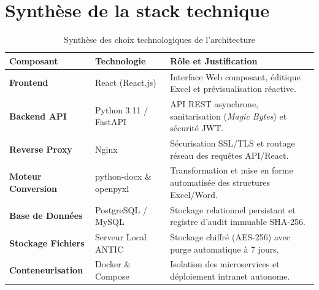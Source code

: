 \section{Synthèse de la stack technique}

\begin{table}[H]
\centering
\small
\begin{tabular}{|L{3cm}|L{3.5cm}|L{7.5cm}|}
\hline
{}
\textbf{Composant} & \textbf{Technologie} & \textbf{Rôle et Justification} \\
\hline
\textbf{Frontend} & React (React.js) & Interface Web composant, éditique Excel et prévisualisation réactive. \\
\hline
\textbf{Backend API} & Python 3.11 / FastAPI & API REST asynchrone, sanitarisation (\textit{Magic Bytes}) et sécurité JWT. \\
\hline
\textbf{Reverse Proxy} & Nginx & Sécurisation SSL/TLS et routage réseau des requêtes API/React. \\
\hline
\textbf{Moteur Conversion} & python-docx \& openpyxl & Transformation et mise en forme automatisée des structures Excel/Word. \\
\hline
\textbf{Base de Données} & PostgreSQL / MySQL & Stockage relationnel persistant et registre d'audit immuable SHA-256. \\
\hline
\textbf{Stockage Fichiers} & Serveur Local ANTIC & Stockage chiffré (AES-256) avec purge automatique à 7 jours. \\
\hline
\textbf{Conteneurisation} & Docker \& Compose & Isolation des microservices et déploiement intranet autonome. \\
\hline
\end{tabular}
\caption{Synthèse des choix technologiques de l'architecture}
\end{table}
